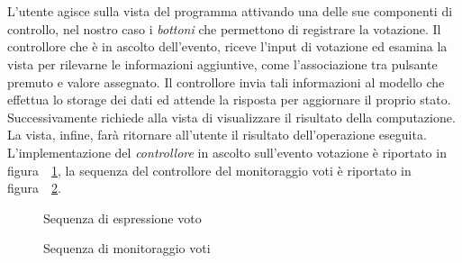 \\\\L'utente agisce sulla vista del programma attivando una delle sue componenti
di controllo, nel nostro caso i \emph{bottoni} che permettono di registrare la
votazione. Il controllore che è in ascolto dell'evento, riceve l'input di
votazione ed esamina la vista per rilevarne le informazioni aggiuntive, come
l'associazione tra pulsante premuto e valore assegnato. Il controllore invia
tali informazioni al modello che effettua lo storage dei dati ed
attende la risposta per aggiornare il proprio stato. Successivamente richiede
alla vista di visualizzare il risultato della computazione. La vista, infine,
farà ritornare all'utente il risultato dell'operazione eseguita.
L'implementazione del \emph{controllore} in ascolto sull'evento votazione è
riportato in figura~~\ref{fig:votingcontroller}, la sequenza del controllore
del monitoraggio voti è riportato in figura~~\ref{fig:monitoringcontroller}.

\begin{figure}[!h]
  \centering
  \caption{Sequenza di espressione voto}
  \label{fig:votingcontroller}
\end{figure}

\begin{figure}[!h]
  \centering
  \caption{Sequenza di monitoraggio voti}
  \label{fig:monitoringcontroller}
\end{figure}